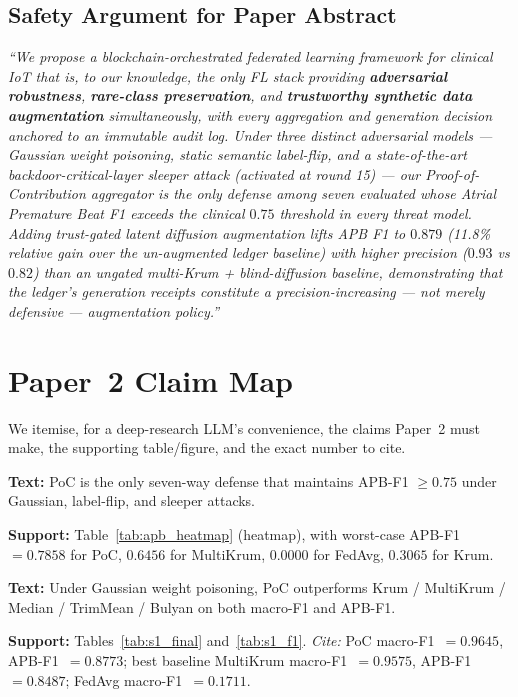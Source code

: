 \documentclass[11pt,a4paper]{article}
\begin{document}
\subsection{Safety Argument for Paper Abstract}

\textit{``We propose a blockchain-orchestrated federated learning
framework for clinical IoT that is, to our knowledge, the only FL stack
providing \textbf{adversarial robustness}, \textbf{rare-class
preservation}, and \textbf{trustworthy synthetic data augmentation}
simultaneously, with every aggregation and generation decision anchored
to an immutable audit log. Under three distinct adversarial models ---
Gaussian weight poisoning, static semantic label-flip, and a
state-of-the-art backdoor-critical-layer sleeper attack (activated at
round 15) --- our Proof-of-Contribution aggregator is the only defense
among seven evaluated whose Atrial Premature Beat F1 exceeds the
clinical $0.75$ threshold in \textit{every} threat model. Adding
trust-gated latent diffusion augmentation lifts APB F1 to $0.879$
(11.8\% relative gain over the un-augmented ledger baseline) with
higher precision ($0.93$ vs $0.82$) than an ungated multi-Krum +
blind-diffusion baseline, demonstrating that the ledger's generation
receipts constitute a precision-increasing --- not merely defensive ---
augmentation policy.''}

\section{Paper~2 Claim Map}
\label{sec:claimmap}

We itemise, for a deep-research LLM's convenience, the claims Paper~2
must make, the supporting table/figure, and the exact number to cite.

\begin{claimbox}
\textbf{Text:} PoC is the only seven-way defense that maintains APB-F1
$\geq 0.75$ under Gaussian, label-flip, and sleeper attacks.

\textbf{Support:} Table~\ref{tab:apb_heatmap} (heatmap), with
worst-case APB-F1 $=0.7858$ for PoC, $0.6456$ for MultiKrum, $0.0000$
for FedAvg, $0.3065$ for Krum.
\end{claimbox}

\begin{claimbox}
\textbf{Text:} Under Gaussian weight poisoning, PoC outperforms Krum /
MultiKrum / Median / TrimMean / Bulyan on both macro-F1 and APB-F1.

\textbf{Support:} Tables~\ref{tab:s1_final} and~\ref{tab:s1_f1}.
\textit{Cite:} PoC macro-F1~$=0.9645$, APB-F1~$=0.8773$; best baseline
MultiKrum macro-F1~$=0.9575$, APB-F1~$=0.8487$; FedAvg macro-F1~$=0.1711$.
\end{claimbox}
\end{document}
